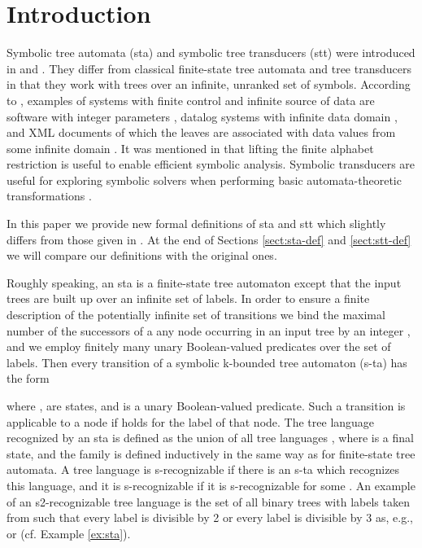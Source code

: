 \documentclass[10pt]{scrartcl}
\begin{document}
\section{Introduction}

\label{introduction} Symbolic tree automata (sta) and symbolic tree transducers (stt) were introduced in \cite{veabjo11a} and \cite{veabjo11b}. They differ from classical finite-state tree automata and tree transducers \cite{gecste84,gecste97} in that they work with trees over an infinite, unranked set of symbols. 
According to \cite{grukupshe10}, examples of systems with finite control and infinite source of data are software with integer parameters \cite{bouhabmay03}, datalog systems with infinite data domain \cite{bouhabjursig07}, and XML documents of which the leaves are associated with data values from some infinite domain
\cite{bracercomframan03}. It was mentioned in \cite{veabjo11a} that lifting the finite alphabet restriction is useful to enable efficient symbolic analysis. Symbolic transducers are useful for exploring symbolic solvers when performing basic automata-theoretic transformations \cite{veahoolivmolbjo12}. 

In this paper we provide new formal definitions of sta and stt which slightly differs from those given in \cite{veabjo11a,veabjo11b}. At the end of Sections \ref{sect:sta-def} and \ref{sect:stt-def} we will compare our definitions with the original ones.


Roughly speaking, an sta is a finite-state tree automaton \cite{don70}  except that the input trees are built up over an infinite set of labels. In order to ensure a finite description of the potentially infinite set of transitions we bind the maximal number of the successors of a any node
occurring in an input tree by an integer , and we employ finitely many unary Boolean-valued predicates over the set of labels.  Then every transition of a symbolic k-bounded tree automaton (s-ta) has the form 

where ,  are states, and  is a unary Boolean-valued predicate. Such a transition is applicable to a node if  holds for the label of that node.
The tree language  recognized by an sta  is defined as the union of all tree languages , where  is a final state, and the family  is defined inductively in the same way as for finite-state tree automata. A tree language is s-recognizable if there is an s-ta which recognizes this language, and it is s-recognizable if it is s-recognizable for some .
An example of an s2-recognizable tree language is 
the set of all binary trees with labels taken from  such that every label is divisible by 2 or every label is divisible by 3 as, e.g.,  or  (cf. Example \ref{ex:sta}).  
\end{document}
